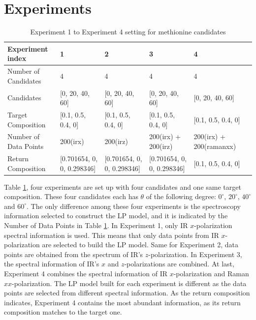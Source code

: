 \section{Experiments}
\begin{table}\tiny \label{tab:4.1}
\begin{center}
\begin{tabular}{| l | l | l | l | l | l }
\hline
Experiment index & 1 & 2 & 3 & 4 \\
\hline
Number of Candidates & 4 & 4 & 4 & 4 \\
\hline
Candidates & [0, 20, 40, 60] & [0, 20, 40, 60] & [0, 20, 40, 60] & [0, 20, 40, 60]\\
\hline
Target Composition & [0.1, 0.5, 0.4, 0] & [0.1, 0.5, 0.4, 0] & [0.1, 0.5, 0.4, 0] & [0.1, 0.5, 0.4, 0]\\
\hline
Number of Data Points & 200(irx) & 200(irz) & 200(irx) + 200(irz) & 200(irx) + 200(ramanxx)\\
\hline
Return Composition & [0.701654, 0, 0, 0.298346] & [0.701654, 0, 0, 0.298346] & [0.701654, 0, 0, 0.298346] & [0.1, 0.5, 0.4, 0]\\
\hline
\end{tabular} 
\end{center}
\caption{Experiment 1 to Experiment 4 setting for methionine candidates} 
\end{table}	

Table \ref{tab:4.1}, four experiments are set up with four candidates and one same target composition. These four candidates each has $\theta$ of the following degree: $0^{\circ}$, $20^{\circ}$, $40^{\circ}$ and $60^{\circ}$. The only difference among these four experiments is the spectroscopy information selected to construct the LP model, and it is indicated by the Number of Data Points in Table \ref{tab:4.1}. In Experiment 1, only IR $x$-polarization spectral information is used. This means that only data points from IR $x$-polarization are selected to build the LP model. Same for Experiment 2, data points are obtained from the spectrum of IR's $z$-polarization. In Experiment 3, the spectral information of IR's $x$ and $z$-polarizations are combined. At last, Experiment 4 combines the spectral information of IR $x$-polarization and Raman $xx$-polarization. The LP model built for each experiment is different as the data points are selected from different spectral information. As the return composition indicates, 
Experiment 4 contains the most abundant information, as its return composition matches to the target one. \\

